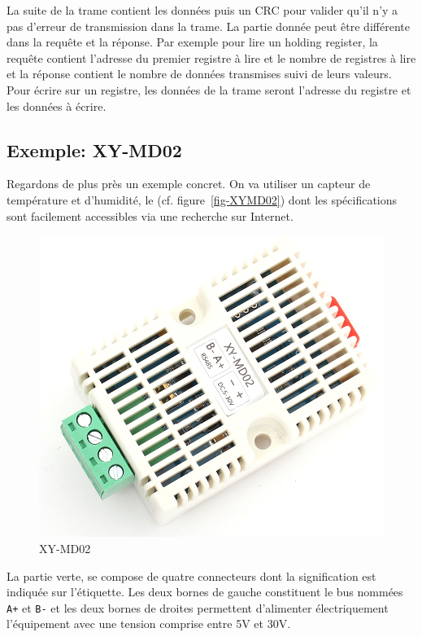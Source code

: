     \vspace{1em}

La suite de la trame contient les données puis un \ac{CRC} pour valider qu'il n'y a pas d'erreur de transmission dans la trame. La partie donnée peut être différente dans la requête et la réponse. Par exemple pour lire un holding register, la requête contient l'adresse du premier registre à lire et le nombre de registres à lire et la réponse contient le nombre de données transmises suivi de leurs valeurs. Pour écrire sur un registre, les données de la trame seront l'adresse du registre et les données à écrire.

\subsection{Exemple: XY-MD02}


Regardons de plus près un exemple concret. On va utiliser un capteur de température et d'humidité, le  (cf. figure~\vref{fig-XYMD02}) dont les spécifications sont facilement accessibles via une recherche sur Internet. 

\begin{figure}[tbp]
\centerline{\includegraphics[width=0.5\columnwidth]{Pictures/XY-MD02.png}}
\caption{XY-MD02}
\label{fig-XYMD02}
\end{figure}

La partie verte, se compose de quatre connecteurs dont la signification est indiquée sur l'étiquette. Les deux bornes de gauche constituent le bus  nommées \texttt{A+} et \texttt{B-} et les deux bornes de droites permettent d'alimenter électriquement l'équipement avec une tension comprise entre 5V et 30V.

    \vspace{1em}

 \begin{figure}
\end{figure}

